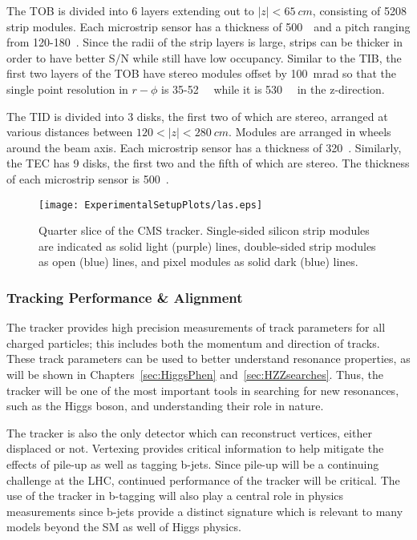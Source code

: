 The TOB is divided into 6 layers extending out to $|z|<65~cm$, 
consisting of 5208 strip modules.  Each microstrip sensor has a 
thickness of 500~\microns~and a pitch ranging from 
120-180~\microns.  Since the radii of the strip layers is large, 
strips can be thicker in order to have better S/N while 
still have low occupancy.  Similar to the TIB, the first two 
layers of the TOB have stereo modules offset by 100~mrad so that 
the single point resolution in $r-\phi$ is 35-52~\microns~ while 
it is 530~\microns~ in the z-direction.

The TID is divided into 3 disks, the first two of which are stereo, 
arranged at various distances between $120<|z|<280~cm$.  Modules
are arranged in wheels around the beam axis.  Each microstrip 
sensor has a  thickness of 320~\microns.  Similarly, the TEC has 9
disks, the first two and the fifth of which are stereo.  The 
thickness of each microstrip sensor is 500~\microns. 

\begin{figure}
\begin{center}
\hspace{-2.5cm}
\texttt{[image: ExperimentalSetupPlots/las.eps]}
\caption{Quarter slice of the CMS tracker.  Single-sided silicon strip modules
are indicated as solid light (purple) lines, double-sided strip modules as 
open (blue) lines, and pixel modules as solid dark (blue) lines.}
\label{fig:TrackerGeometry}
\end{center}
\end{figure}

\subsubsection{Tracking Performance \& Alignment}
\label{sec:alignment}

The tracker provides high precision measurements of track 
parameters for all charged particles; this includes both the
momentum and direction of tracks.  These track parameters can be
used to better understand resonance properties, as will be shown in 
Chapters~\ref{sec:HiggsPhen} and~\ref{sec:HZZsearches}.  Thus, the 
tracker will be one of the most important tools in searching for 
new resonances, such as the Higgs boson, and understanding their 
role in nature.  

The tracker is also the only detector which can reconstruct 
vertices, either displaced or not.  Vertexing provides critical 
information to help mitigate the effects of pile-up as well as 
tagging b-jets.  Since pile-up will be a continuing challenge at 
the LHC, continued performance of the tracker will be critical.  
The use of the tracker in b-tagging will also play a central role 
in physics measurements since b-jets provide a distinct 
signature which is relevant to many models beyond the SM
as well of Higgs physics.  

